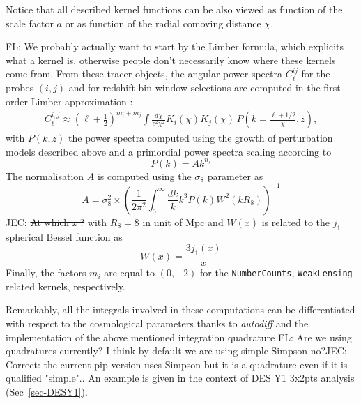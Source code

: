 \documentclass[twocolumn,twocolappendix,nofootinbib,iop]{openjournal}
\newcommand{\FrL}[1]{{\color{cyan}FL: #1}}
\newcommand{\JZ}[1]{{\color{purple}JZ: #1}}
\newcommand{\JEC}[1]{{\color{magenta}JEC: #1}}
\begin{document}
Notice that all described kernel functions can be also viewed as function of the scale factor $a$ or as function of the radial comoving distance $\chi$. 

\FrL{We probably actually want to start by the Limber formula, which explicits what a kernel is, otherwise people don't necessarily know where these kernels come from.}
From these tracer objects, the angular power spectra $C_\ell^{ij}$ for the probes $(i,j)$ and for redshift bin window selections are computed in the first order Limber approximation \citep{PhysRevD.78.123506}:
\begin{align}
    C_\ell^{i,j} \approx \left(\ell+\frac{1}{2}\right)^{m_i+m_j}\int\frac{d\chi}{c^2\chi^2}K_i(\chi)K_j(\chi)\,P\left(k=\frac{\ell+1/2}{\chi},z\right),\label{eq:Cell_limber}
\end{align}
with $P(k,z)$ the power spectra computed using the growth of perturbation models described above and a primordial power spectra scaling according to
\begin{equation}
    P(k) = A k^{n_s}
\end{equation}
The normalisation $A$ is computed using the $\sigma_8$ parameter as 
\begin{equation}
    A = \sigma_8^2 \times \left(\frac{1}{2 \pi^2} \int_0^\infty \frac{dk}{k} k^3 P(k) W^2(kR_8) \right)^{-1}
\end{equation}
\JEC{\st{At which z ?}}
with $R_8 = 8$ in unit of Mpc and $W(x)$ is related to the $j_1$ spherical Bessel function as
\begin{equation}
    W(x) = \frac{3j_1(x)}{x}
\end{equation}
Finally, the factors $m_i$ are equal to $(0,-2)$ for the \texttt{NumberCounts}, \texttt{WeakLensing} related kernels, respectively. 

Remarkably, all the integrals involved in these computations can be  differentiated with respect to the cosmological parameters thanks to \textit{autodiff} and the implementation of the above mentioned integration quadrature \FrL{Are we using quadratures currently? I think by default we are using simple Simpson no?}\JEC{Correct: the current pip version uses Simpson but it is a quadrature even if it is qualified "simple".}.  An example is given in the context of DES Y1 3x2pts analysis (Sec~\ref{sec-DESY1}).
%
\end{document}

